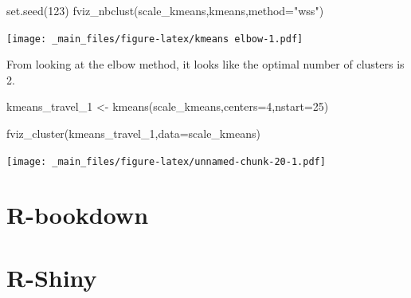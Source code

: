 \documentclass[
]{book}
\newenvironment{Shaded}{\begin{snugshade}}{\end{snugshade}}
\newcommand{\AttributeTok}[1]{\textcolor[rgb]{0.77,0.63,0.00}{#1}}
\newcommand{\DecValTok}[1]{\textcolor[rgb]{0.00,0.00,0.81}{#1}}
\newcommand{\FunctionTok}[1]{\textcolor[rgb]{0.00,0.00,0.00}{#1}}
\newcommand{\NormalTok}[1]{#1}
\newcommand{\OtherTok}[1]{\textcolor[rgb]{0.56,0.35,0.01}{#1}}
\newcommand{\StringTok}[1]{\textcolor[rgb]{0.31,0.60,0.02}{#1}}
\begin{document}
\begin{Shaded}
\begin{Highlighting}[]
\FunctionTok{set.seed}\NormalTok{(}\DecValTok{123}\NormalTok{)}
\FunctionTok{fviz\_nbclust}\NormalTok{(scale\_kmeans,kmeans,}\AttributeTok{method=}\StringTok{"wss"}\NormalTok{)}
\end{Highlighting}
\end{Shaded}

\texttt{[image: \_main\_files/figure-latex/kmeans elbow-1.pdf]}

From looking at the elbow method, it looks like the optimal number of clusters is 2.

\begin{Shaded}
\begin{Highlighting}[]
\NormalTok{kmeans\_travel\_1 }\OtherTok{\textless{}{-}} \FunctionTok{kmeans}\NormalTok{(scale\_kmeans,}\AttributeTok{centers=}\DecValTok{4}\NormalTok{,}\AttributeTok{nstart=}\DecValTok{25}\NormalTok{)}

\FunctionTok{fviz\_cluster}\NormalTok{(kmeans\_travel\_1,}\AttributeTok{data=}\NormalTok{scale\_kmeans)}
\end{Highlighting}
\end{Shaded}

\texttt{[image: \_main\_files/figure-latex/unnamed-chunk-20-1.pdf]}

\hypertarget{r-bookdown}{%
\section{R-bookdown}\label{r-bookdown}}

\hypertarget{r-shiny}{%
\section{R-Shiny}\label{r-shiny}}

  
\end{document}
